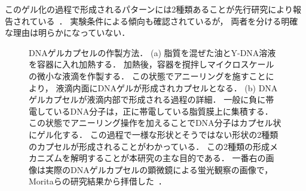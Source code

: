 このゲル化の過程で形成されるパターンには2種類あることが先行研究により報告されている~\cite{morita2017formation}．
実験条件による傾向も確認されているが，
両者を分ける明確な理由は明らかになっていない．

\begin{figure}
\centering

\caption{DNAゲルカプセルの作製方法．
    (a) 脂質を混ぜた油とY-DNA溶液を容器に入れ加熱する．
        加熱後，容器を撹拌しマイクロスケールの微小な液滴を作製する．
        この状態でアニーリングを施すことにより，
        液滴内面にDNAゲルが形成されカプセルとなる．
    (b) DNAゲルカプセルが液滴内部で形成される過程の詳細．
        一般に負に帯電しているDNA分子は，正に帯電している脂質膜上に集積する．
        この状態でアニーリング操作を加えることでDNA分子はカプセル状にゲル化する．
        この過程で一様な形状とそうではない形状の2種類のカプセルが形成されることがわかっている．
        この2種類の形成メカニズムを解明することが本研究の主な目的である．
        一番右の画像は実際のDNAゲルカプセルの顕微鏡による蛍光観察の画像で，
        Moritaらの研究結果から拝借した~\cite{morita2017formation}．
}

\label{fig:capsule}
\end{figure}
